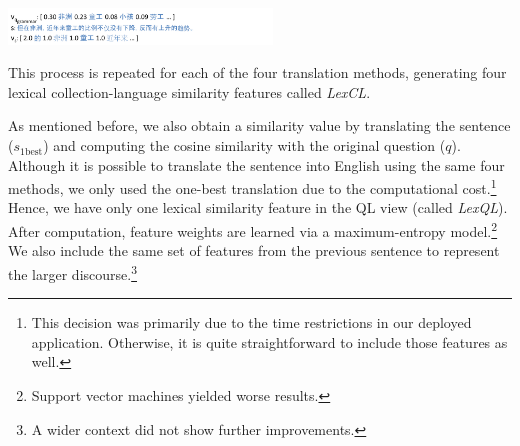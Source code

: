 \documentclass{sig-alternate-05-2015}
\begin{document}
\includegraphics[width=7cm]{example2.pdf}

This process is repeated for each of the four translation methods, generating four lexical collection-language similarity features 
called \emph{LexCL}.


As mentioned before, we also obtain a similarity value by translating the sentence ($s_{\textrm{1best}}$) 
and computing the cosine similarity with the original question ($q$). Although it is possible to translate the 
sentence into English using the same four methods, we only used the one-best translation due to the computational 
cost.\footnote{This decision was primarily due to the time restrictions in our deployed application. Otherwise, it is
quite straightforward to include those features as well.} Hence, we have only one lexical similarity feature in the QL 
view (called \emph{LexQL}).
After computation, feature weights are learned via a maximum-entropy model.\footnote{Support vector machines 
yielded worse results.} We also include the 
same set of features from the previous sentence to represent the larger discourse.\footnote{A wider context did not
show further improvements.}

\end{document}
